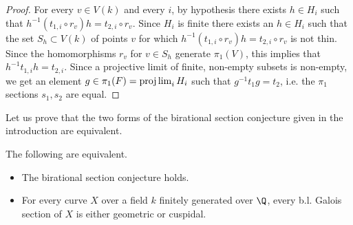 \begin{lemma}
\begin{proof}
		For every $v\in V(k)$ and every $i$, by hypothesis there exists $h\in H_{i}$ such that $h^{-1}(t_{1,i}\circ r_{v})h=t_{2,i}\circ r_{v}$. Since $H_{i}$ is finite there exists an $h\in H_{i}$ such that the set $S_{h}\subset V(k)$ of points $v$ for which $h^{-1}(t_{1,i}\circ r_{v})h=t_{2,i}\circ r_{v}$ is not thin. Since the homomorphisms $r_{v}$ for $v\in S_{h}$ generate $\pi_{1}(V)$, this implies that $h^{-1}t_{1,i}h=t_{2,i}$.	Since a projective limit of finite, non-empty subsets is non-empty, we get an element $g\in\pi_{1}(F)=\projlim_{i}H_{i}$ such that $g^{-1}t_{1}g=t_{2}$, i.e. the $\pi_{1}$ sections $s_{1},s_{2}$ are equal.
	\end{proof}
\end{lemma}




Let us prove that the two forms of the birational section conjecture given in the introduction are equivalent.

\begin{lemma}
\notready\label{bireq}
    The following are equivalent.
    \begin{itemize}
        \item The birational section conjecture holds.
        \item For every curve $X$ over a field $k$ finitely generated over $\Q$, every b.l. Galois section of $X$ is either geometric or cuspidal.
    \end{itemize}
\end{lemma}

